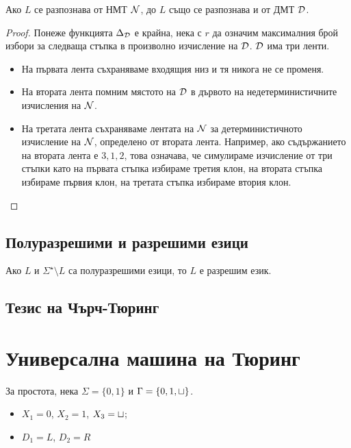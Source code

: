 \begin{thm}
  Ако $L$ се разпознава от НМТ $\mathcal{N}$, до $L$
  също се разпознава и от ДМТ $\mathcal{D}$.
\end{thm}
\begin{proof}
  Понеже функцията $\Delta_{\mathcal{D}}$ е крайна, нека с $r$ да означим 
  максималния брой избори за следваща стъпка в произволно изчисление на $\mathcal{D}$.
  $\mathcal{D}$ има три ленти.
  \begin{itemize}
  \item 
    На първата лента съхраняваме входящия низ и тя никога не се променя.
  \item
    На втората лента помним мястото на $\mathcal{D}$ в дървото на недетерминистичните изчисления на $\mathcal{N}$.  
  \item
    На третата лента съхраняваме лентата на $\mathcal{N}$ за детерминистичното изчисление на $\mathcal{N}$, 
    определено от втората лента. Например, ако съдържанието на втората лента е $3,1,2$,
    това означава, че симулираме изчисление от три стъпки като на първата стъпка избираме третия 
    клон, на втората стъпка избираме първия клон, на третата стъпка избираме втория клон.
  \end{itemize}
\end{proof}


\subsection*{Полуразрешими и разрешими езици}

\begin{framed}
\begin{thm}[Пост]
  Ако $L$ и $\Sigma^\star \setminus L$ са полуразрешими езици, то $L$ е разрешим език.
\end{thm}
\end{framed}




\subsection*{Тезис на Чърч-Тюринг}

\section{Универсална машина на Тюринг}
За простота, нека $\Sigma = \{0,1\}$ и $\Gamma = \{0,1,\sqcup\}$.
\begin{itemize}
\item 
  $X_1 = 0$, $X_2 = 1$, $X_3 = \sqcup$;
\item
  $D_1 = L$, $D_2 = R$
\end{itemize}

